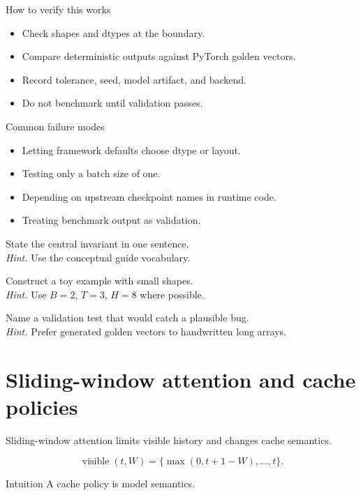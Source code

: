 \begin{verificationbox}{How to verify this works}
\begin{itemize}
\item Check shapes and dtypes at the boundary.
\item Compare deterministic outputs against PyTorch golden vectors.
\item Record tolerance, seed, model artifact, and backend.
\item Do not benchmark until validation passes.
\end{itemize}
\end{verificationbox}

\begin{warningbox}{Common failure modes}
\begin{itemize}
\item Letting framework defaults choose dtype or layout.
\item Testing only a batch size of one.
\item Depending on upstream checkpoint names in runtime code.
\item Treating benchmark output as validation.
\end{itemize}
\end{warningbox}

\begin{chapterexercises}
\item State the central invariant in one sentence.\\
\textit{Hint.} Use the conceptual guide vocabulary.
\item Construct a toy example with small shapes.\\
\textit{Hint.} Use $B=2$, $T=3$, $H=8$ where possible.
\item Name a validation test that would catch a plausible bug.\\
\textit{Hint.} Prefer generated golden vectors to handwritten long arrays.
\end{chapterexercises}

\chapter{Sliding-window attention and cache policies}
\label{ch:sliding-window}
Sliding-window attention limits visible history and changes cache semantics. \citep{jiang2023mistral}

\[
\operatorname{visible}(t,W)=\{\max(0,t+1-W),\ldots,t\}.
\]

\begin{intuitionbox}{Intuition}
A cache policy is model semantics.
\end{intuitionbox}

